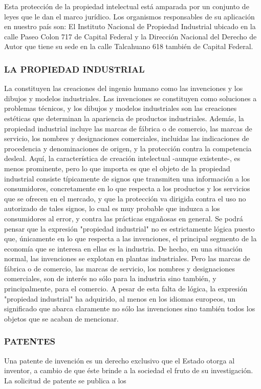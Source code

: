 Esta protección de la propiedad intelectual está amparada por un conjunto de leyes que le dan el marco jurídico. Los organismos responsables de su aplicación en nuestro país son: El Instituto Nacional de Propiedad Industrial ubicado en la calle Paseo Colon 717 de Capital Federal y la Dirección Nacional del Derecho de Autor que tiene su sede en la calle Talcahuano 618 también de Capital Federal.

\subsubsection*{LA PROPIEDAD INDUSTRIAL}
La constituyen las creaciones del ingenio humano como las invenciones y los dibujos y modelos industriales. Las invenciones se constituyen como soluciones a problemas técnicos, y los dibujos y modelos industriales son las creaciones estéticas que determinan la apariencia de productos industriales. Además, la propiedad industrial incluye las marcas de fábrica o de comercio, las marcas de servicio, los nombres y designaciones comerciales, incluidas las indicaciones de procedencia y denominaciones de origen, y la protección contra la competencia desleal. Aquí, la característica de creación intelectual -aunque existente-, es menos prominente, pero lo que importa es que el objeto de la propiedad industrial consiste típicamente de signos que transmiten una información a los consumidores, concretamente en lo que respecta a los productos y los servicios que se ofrecen en el mercado, y que la protección va dirigida contra el uso no autorizado de tales signos, lo cual es muy probable que induzca a los consumidores al error, y contra las prácticas engañosas en general. Se podrá pensar que la expresión "propiedad industrial" no es estrictamente lógica puesto que, únicamente en lo que respecta a las invenciones, el principal segmento de la economía que se interesa en ellas es la industria. De hecho, en una situación normal, las invenciones se explotan en plantas industriales. Pero las marcas de fábrica o de comercio, las marcas de servicio, los nombres y designaciones comerciales, son de interés no sólo para la industria sino también, y principalmente, para el comercio. A pesar de esta falta de lógica, la expresión "propiedad industrial" ha adquirido, al menos en los idiomas europeos, un significado que abarca claramente no sólo las invenciones sino también todos los objetos que se acaban de mencionar.

\subsubsection*{PATENTES}
Una patente de invención es un derecho exclusivo que el Estado otorga al inventor, a cambio de que éste brinde a la sociedad el fruto de su investigación. La solicitud de patente se publica a los


